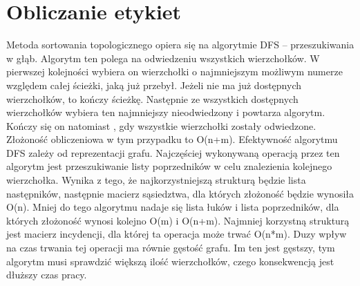 \documentclass[polish,polish,a4paper]{article}
\begin{document}
\section{Obliczanie etykiet}
	\begin{figure}[H]
		\centering
	\end{figure}
	
Metoda sortowania topologicznego opiera się na algorytmie DFS – przeszukiwania w głąb. Algorytm ten polega na odwiedzeniu wszystkich wierzchołków. W pierwszej kolejności wybiera on wierzchołki o najmniejszym możliwym numerze względem całej ścieżki, jaką już przebył. Jeżeli nie ma już dostępnych wierzchołków, to kończy ścieżkę. Następnie ze wszystkich dostępnych wierzchołków wybiera ten najmniejszy nieodwiedzony i powtarza algorytm. Kończy się on natomiast , gdy wszystkie wierzchołki zostały odwiedzone. Złożoność obliczeniowa w tym przypadku to O(n+m). Efektywność algorytmu DFS zależy od reprezentacji grafu. Najczęściej wykonywaną operacją przez ten algorytm jest przeszukiwanie listy poprzedników w celu znalezienia kolejnego wierzchołka. Wynika z tego, że najkorzystniejszą strukturą będzie lista następników, następnie macierz sąsiedztwa, dla których złożoność będzie wynosiła O(n). Mniej do tego algorytmu nadaje się lista łuków i lista poprzedników, dla których złożoność wynosi kolejno O(m) i O(n+m). Najmniej korzystną strukturą jest macierz incydencji, dla której ta operacja może trwać O(n*m). Duzy wpływ na czas trwania tej operacji ma równie gęstość grafu. Im ten jest gęstszy, tym algorytm musi sprawdzić większą ilość wierzchołków, czego konsekwencją jest dłuższy czas pracy.
	
\end{document}
